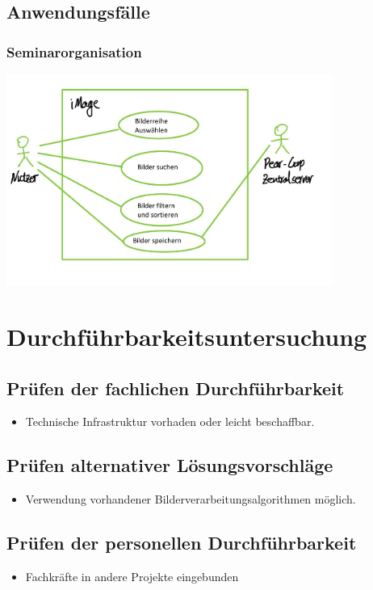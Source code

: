 \documentclass[parskip=full]{scrartcl}
\begin{document}
\subsection{Anwendungsfälle}
\subsubsection{Seminarorganisation}
\begin{center}
	\includegraphics[width=0.8\textwidth]{Anwendungsfall.jpg}
\end{center}

\section{Durchführbarkeitsuntersuchung}

\subsection{Prüfen der fachlichen Durchführbarkeit}
\begin{itemize}
	\item Technische Infrastruktur vorhaden oder leicht beschaffbar.
\end{itemize}

\subsection{Prüfen alternativer Lösungsvorschläge}
\begin{itemize}
	\item Verwendung vorhandener Bilderverarbeitungsalgorithmen möglich.
\end{itemize}
\subsection{Prüfen der personellen Durchführbarkeit}
\begin{itemize}
	\item Fachkräfte in andere Projekte eingebunden
\end{itemize}
\end{document}
